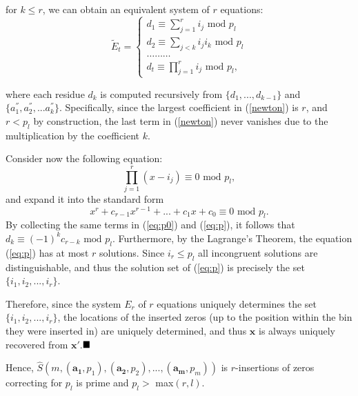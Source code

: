 \documentclass[12pt]{article} \pagestyle{plain} \topmargin
\begin{document}
for $k \leq r$, we can obtain an equivalent system of $r$ equations:
\begin{equation}
\widetilde{E}_t=\left\{
\begin{array}{ll}
d_1 \equiv \sum_{j=1}^r i_j \text{ mod }p_l\\
d_2 \equiv \sum_{j<k} i_j i_k\text{ mod }p_l\\
\dots \dots \dots \\
d_t \equiv \prod_{j=1}^r i_j \text{ mod }p_l,
\end{array} \right.
\end{equation}

where each residue $d_k$ is computed recursively from
$\{d_1,...,d_{k-1}\}$ and $\{a_1^{''},a_2^{''},...a_k^{''}\}$.
Specifically, since the largest coefficient in (\ref{newton}) is
$r$, and $r<p_l$ by construction, the last term in (\ref{newton})
never vanishes due to the multiplication by the coefficient $k$.

Consider now the following equation:
\begin{equation}\label{eq:p0} \prod_{j=1}^r(x-i_j)\equiv 0 \text{ mod } p_l,
\end{equation}
and expand it into the standard form
\begin{equation}\label{eq:p}
x^r+c_{r-1}x^{r-1}+...+c_1x+c_0 \equiv 0 \text{ mod } p_l.
\end{equation}
By collecting the same terms in (\ref{eq:p0}) and (\ref{eq:p}), it
follows that $d_k \equiv (-1)^kc_{r-k} \text{ mod } p_l$.
Furthermore, by the Lagrange's Theorem, the equation (\ref{eq:p})
has at most $r$ solutions. Since $i_r \leq p_l$ all incongruent
solutions are distinguishable, and thus the solution set of
(\ref{eq:p}) is precisely the set $\{i_1,i_2,...,i_r\}$.

Therefore, since the system $E_r$ of $r$ equations uniquely
determines the set $\{i_1,i_2,...,i_r\}$, the locations of the
inserted zeros (up to the position within the bin they were inserted
in) are uniquely determined, and thus $\mathbf{x}$ is always
uniquely recovered from $\mathbf{x'}$.$\hfill\blacksquare$

Hence,
$\hat{S}\left(m,(\mathbf{a_1},p_1),(\mathbf{a_2},p_2),...,(\mathbf{a_m},p_m)\right)$
is $r$-insertions of zeros correcting for $p_l$ is prime and $p_l
>$ max$(r,l)$.
\end{document}
